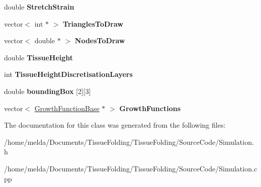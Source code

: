 \begin{DoxyCompactItemize}
\item 
\hypertarget{classSimulation_a76aca0fc8a6de8550af15556d18e6dfb}{}double {\bfseries Stretch\+Strain}\label{classSimulation_a76aca0fc8a6de8550af15556d18e6dfb}

\item 
\hypertarget{classSimulation_aaffbf9ee13e071aa1cdc8e75a0d79774}{}vector$<$ int $\ast$ $>$ {\bfseries Triangles\+To\+Draw}\label{classSimulation_aaffbf9ee13e071aa1cdc8e75a0d79774}

\item 
\hypertarget{classSimulation_aa08434e5c71b265f87aab46be36438be}{}vector$<$ double $\ast$ $>$ {\bfseries Nodes\+To\+Draw}\label{classSimulation_aa08434e5c71b265f87aab46be36438be}

\item 
\hypertarget{classSimulation_adad1e5ce0657d347c8b46a4d1749caa3}{}double {\bfseries Tissue\+Height}\label{classSimulation_adad1e5ce0657d347c8b46a4d1749caa3}

\item 
\hypertarget{classSimulation_aafb36172155cdd675fb7d8cbe057c0ab}{}int {\bfseries Tissue\+Height\+Discretisation\+Layers}\label{classSimulation_aafb36172155cdd675fb7d8cbe057c0ab}

\item 
\hypertarget{classSimulation_a8e5b5de0190d35c7984c4b393fd9fcd9}{}double {\bfseries bounding\+Box} \mbox{[}2\mbox{]}\mbox{[}3\mbox{]}\label{classSimulation_a8e5b5de0190d35c7984c4b393fd9fcd9}

\item 
\hypertarget{classSimulation_a88e857983b0152e32b969dfd3ed72fdc}{}vector$<$ \hyperlink{classGrowthFunctionBase}{Growth\+Function\+Base} $\ast$ $>$ {\bfseries Growth\+Functions}\label{classSimulation_a88e857983b0152e32b969dfd3ed72fdc}

\end{DoxyCompactItemize}


The documentation for this class was generated from the following files\+:\begin{DoxyCompactItemize}
\item 
/home/melda/\+Documents/\+Tissue\+Folding/\+Tissue\+Folding/\+Source\+Code/Simulation.\+h\item 
/home/melda/\+Documents/\+Tissue\+Folding/\+Tissue\+Folding/\+Source\+Code/Simulation.\+cpp\end{DoxyCompactItemize}
